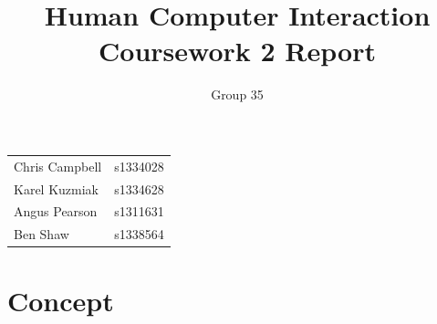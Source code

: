 \documentclass[a4paper, notoc]{tufte-handout}
\title{Human Computer Interaction\\ Coursework 2 Report}
\author{Group 35}
\begin{document}
\maketitle %
\vspace{1em}
\noindent
\begin{tabular}{l r}
  Chris Campbell & s1334028\\
  Karel Kuzmiak  & s1334628\\
  Angus Pearson  & s1311631\\
  Ben Shaw       & s1338564\\
\end{tabular}


\section{Concept}\label{sec:concept}
\end{document}
